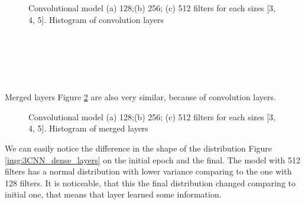 \begin{figure}[ht]
	\begin{minipage}[ht]{1\linewidth}
	\end{minipage}
	\hfill
	\begin{minipage}[ht]{1\linewidth}
	\end{minipage}
	\begin{minipage}[ht]{1\linewidth}
	\end{minipage}
	\caption{Convolutional model (a) 128;(b) 256; (c) 512 filters for each sizes [3, 4, 5]. Histogram of convolution layers}
	\label{img:3CNN_conv_layers}  
\end{figure}

\noindent
\\
\\
\\
\\
\\
Merged layers Figure \ref{img:3CNN_merged_layers} are also very similar, because of convolution layers.

\begin{figure}[ht]
	\begin{minipage}[ht]{1\linewidth}
	\end{minipage}
	\hfill
	\begin{minipage}[ht]{1\linewidth}
	\end{minipage}
	\begin{minipage}[ht]{1\linewidth}
	\end{minipage}
	\caption{Convolutional model (a) 128;(b) 256; (c) 512 filters for each sizes [3, 4, 5]. Histogram of merged layers}
	\label{img:3CNN_merged_layers}  
\end{figure}

\clearpage
We can easily notice the difference in the shape of the distribution Figure \ref{img:3CNN_dense_layers} on the initial epoch and the final. The model with 512 filters has a normal distribution with lower variance comparing to the one with 128 filters. It is noticeable, that this the final distribution changed comparing to initial one, that means that layer learned some information. 

